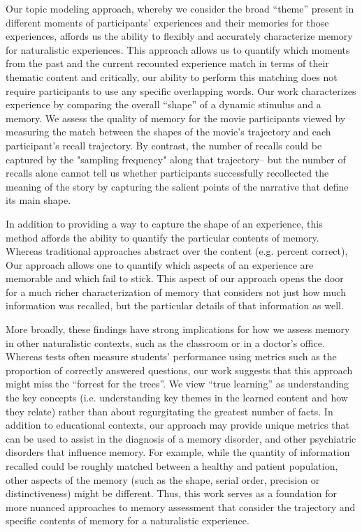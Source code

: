 \documentclass{article}
\begin{document}
{Our topic modeling approach, whereby we consider the broad ``theme'' present in different moments of participants' experiences and their memories for those experiences, affords us the ability to flexibly and accurately characterize memory for naturalistic experiences. This approach allows us to quantify which moments from the past and the current recounted experience match in terms of their thematic content and critically, our ability to perform this matching does not require participants to use any specific overlapping words. Our work characterizes experience by comparing the overall ``shape'' of a dynamic stimulus and a memory. We assess the quality of memory for the movie participants viewed by measuring the match between the shapes of the movie's trajectory and each participant's recall trajectory. By contrast, the number of recalls could be captured by the "sampling frequency" along that trajectory-- but the number of recalls alone cannot tell us whether participants successfully recollected the meaning of the story by capturing the salient points of the narrative that define its main shape.

In addition to providing a way to capture the shape of an experience, this method affords the ability to quantify the particular contents of memory.  Whereas traditional approaches abstract over the content (e.g. percent correct), Our approach allows one to quantify which aspects of an experience are memorable and which fail to stick. This aspect of our approach opens the door for a much richer characterization of memory that considers not just how much information was recalled, but the particular details of that information as well.

More broadly, these findings have strong implications for how we assess memory in other naturalistic contexts, such as the classroom or in a doctor's office.  Whereas tests often measure students' performance using metrics such as the proportion of correctly answered questions, our work suggests that this approach might miss the ``forrest for the trees''. We view ``true learning'' as understanding the key concepts (i.e. understanding key themes in the learned content and how they relate) rather than about regurgitating the greatest number of facts. In addition to educational contexts, our approach may provide unique metrics that can be used to assist in the diagnosis of a memory disorder, and other psychiatric disorders that influence memory. For example, while the quantity of information recalled could be roughly matched between a healthy and patient population, other aspects of the memory (such as the shape, serial order, precision or distinctiveness) might be different. Thus, this work serves as a foundation for more nuanced approaches to memory assessment that consider the trajectory and specific contents of memory for a naturalistic experience.

}
\end{document}
